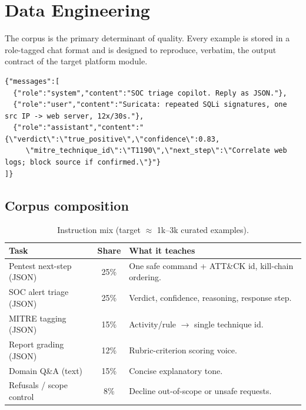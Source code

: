 \documentclass[11pt,a4paper]{article}
\begin{document}
\section{Data Engineering}
The corpus is the primary determinant of quality. Every example is stored in a
role-tagged chat format and is designed to reproduce, verbatim, the output
contract of the target platform module.

\begin{lstlisting}[caption={One instruction example (chat JSONL).}]
{"messages":[
  {"role":"system","content":"SOC triage copilot. Reply as JSON."},
  {"role":"user","content":"Suricata: repeated SQLi signatures, one src IP -> web server, 12x/30s."},
  {"role":"assistant","content":"{\"verdict\":\"true_positive\",\"confidence\":0.83,
     \"mitre_technique_id\":\"T1190\",\"next_step\":\"Correlate web logs; block source if confirmed.\"}"}
]}
\end{lstlisting}

\subsection{Corpus composition}
\begin{table}[h]
\centering\small
\begin{tabular}{@{}lcp{7.6cm}@{}}
\toprule
\textbf{Task} & \textbf{Share} & \textbf{What it teaches}\\
\midrule
Pentest next-step (JSON) & 25\% & One safe command + ATT\&CK id, kill-chain ordering.\\
SOC alert triage (JSON) & 25\% & Verdict, confidence, reasoning, response step.\\
MITRE tagging (JSON) & 15\% & Activity/rule $\rightarrow$ single technique id.\\
Report grading (JSON) & 12\% & Rubric-criterion scoring voice.\\
Domain Q\&A (text) & 15\% & Concise explanatory tone.\\
Refusals / scope control & 8\% & Decline out-of-scope or unsafe requests.\\
\bottomrule
\end{tabular}
\caption{Instruction mix (target $\approx$ 1k--3k curated examples).}
\end{table}
\end{document}
